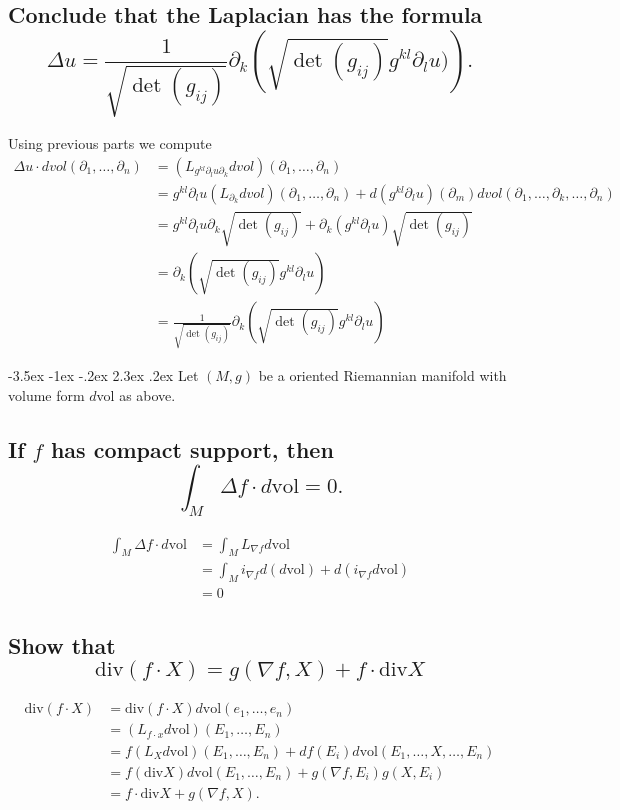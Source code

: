 \documentclass[10pt]{article}
\makeatletter
\renewcommand\section{\@startsection{section}{1}{\z@}%
                                  {-3.5ex \@plus -1ex \@minus -.2ex}%
                                  {2.3ex \@plus.2ex}%
                                  {\normalfont\large\bfseries}}
\newcommand{\del}{{\ensuremath{\partial}} }
\newcommand{\vol}{{\mbox{vol}} }
\renewcommand{\div}{\mbox{div} }
\makeatother
\begin{document}
\subsection{Conclude that the Laplacian has the formula $$\Delta u = \frac{1}{\sqrt{\det(g_{ij})} }\del_k \left( \sqrt{\det(g_{ij})} g^{kl} \del_l u)\right).$$}
Using previous parts we compute
\begin{align*}\Delta u \cdot dvol(\del_1, \dots, \del_n) &= (L_{g^{kl} \del_l u \del_k } dvol) (\del_1, \dots, \del_n) \\&=g^{kl} \del_l u (L_{\del_k} dvol)(\del_1, \dots, \del_n) + d(g^{kl} \del_l u )(\del_m) dvol(\del_1, \dots, \del_k, \dots, \del_n) \\ &= g^{kl} \del_l u \del_k \sqrt{\det(g_{ij})} + \del_k(g^{kl} \del_l u) \sqrt{\det (g_{ij}) } \\&= \del_k \left(  \sqrt{\det (g_{ij})} g^{kl} \del_l u\right)\\ &= \frac{1}{\sqrt{\det(g_{ij})}} \del_k \left( \sqrt{ \det(g_{ij}) } g^{kl} \del_l u\right) \end{align*}

\section{Let $(M,g)$ be a oriented Riemannian manifold with volume form $d$vol as above.}
\subsection{If $f$ has compact support, then $$\int_M \Delta f \cdot d\vol =0.$$}
 \begin{align*}\int_M \Delta f \cdot d\vol &= \int_M L_{\nabla f} d \vol \\ &= \int_M i_{\nabla f} d(d \vol) + d(i_{\nabla f} d \vol) \\ &=0\end{align*}
\subsection{Show that $$\div (f \cdot X) = g(\nabla f, X) + f \cdot \div X$$}
\begin{align*} \div (f \cdot X) &= \div(f \cdot X) d \vol (e_1, \dots, e_n) \\ &= (L_{f \cdot x} d \vol ) (E_1 , \dots, E_n) \\ &= f(L_X d \vol)(E_1, \dots, E_n) + df (E_i) d \vol (E_1, \dots, X, \dots, E_n) \\ &= f(\div X) d \vol(E_1, \dots, E_n) + g(\nabla f, E_i)g(X,E_i) \\ &= f \cdot \div X + g(\nabla f, X). \end{align*}
\end{document}
